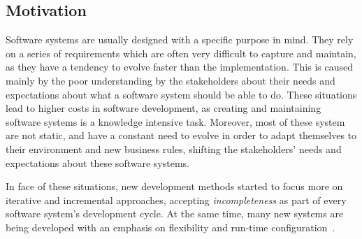 \documentclass[9pt,a4paper]{extarticle}
\begin{document}
\begin{multicols}{2}

\section{Motivation}\label{sec:motivation}

Software systems are usually designed with a specific purpose in mind. They rely on a series of requirements which are often very difficult to capture and maintain, as they have a tendency to evolve faster than the implementation. This is caused mainly by the poor understanding by the stakeholders about their needs and expectations about what a software system should be able to do. These situations lead to higher costs in software development, as creating and maintaining software systems is a knowledge intensive task. Moreover, most of these system are not static, and have a constant need to evolve in order to adapt themselves to their environment and new business rules, shifting the stakeholders' needs and expectations about these software systems.

In face of these situations, new development methods started to focus more on iterative and incremental approaches, accepting \emph{incompleteness} as part of every software system's development cycle. At the same time, many new systems are being developed with an emphasis on flexibility and run-time configuration~\cite{YJ02}.


\end{multicols}
\end{document}
